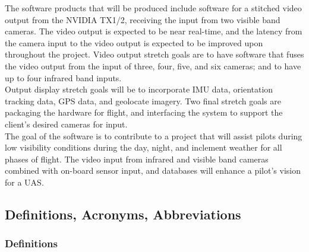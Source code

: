 \documentclass[letterpaper,10pt,serif,draftclsnofoot,onecolumn,compsoc,titlepage]{IEEEtran}
\begin{document}
The software products that will be produced include software for a stitched video output 
from the NVIDIA TX1/2, receiving the input from two visible band cameras. 
The video output is expected to be near real-time, and the latency from the camera 
input to the video output is expected to be improved upon throughout the project. Video 
output stretch goals are to have software that fuses the video output from the input of 
three, four, five, and six cameras; and to have up to four infrared band inputs.\\

Output display stretch goals will be to incorporate IMU data, orientation tracking 
data, GPS data, and geolocate imagery. Two final stretch goals are packaging the 
hardware for flight, and interfacing the system to support the client's desired 
cameras for input.\\

The goal of the software is to contribute to a project that will assist pilots during 
low visibility conditions during the day, night, and inclement weather for all phases 
of flight. The video input from infrared and visible band cameras combined with 
on-board sensor input, and databases will enhance a pilot's vision for a UAS.\\

\subsection{Definitions, Acronyms, Abbreviations}

\subsubsection{Definitions}
\end{document}
